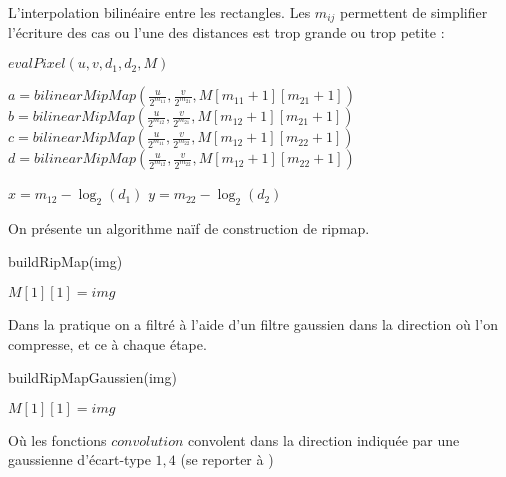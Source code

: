 \medbreak
\medbreak

L'interpolation bilinéaire entre les rectangles.
Les $m_{ij}$ permettent de simplifier l'écriture des cas ou l'une des distances est trop grande ou trop petite :

\medbreak
\medbreak

\begin{algorithm}[H]
\caption{$evalPixel(u,v,d_1,d_2,M)$}

$a=bilinearMipMap(\frac{u}{2^{m_{11}}},\frac{v}{2^{m_{21}}},M[m_{11}+1][m_{21}+1])$\;
$b=bilinearMipMap(\frac{u}{2^{m_{12}}},\frac{v}{2^{m_{21}}},M[m_{12}+1][m_{21}+1])$\;$c=bilinearMipMap(\frac{u}{2^{m_{11}}},\frac{v}{2^{m_{22}}},M[m_{12}+1][m_{22}+1])$\;
$d=bilinearMipMap(\frac{u}{2^{m_{12}}},\frac{v}{2^{m_{22}}},M[m_{12}+1][m_{22}+1])$\;

$x = m_{12} - \log_2(d_1)$\;
$y = m_{22} - \log_2(d_2)$\;

\end{algorithm}



On présente un algorithme naïf de construction de ripmap.
\medbreak
\medbreak
\begin{algorithm}[H]
\caption{buildRipMap(img)}
$M[1][1] = img$\;

\end{algorithm}
\medbreak
\medbreak
Dans la pratique on a filtré à l'aide d'un filtre gaussien dans la direction où l'on compresse, et ce à chaque étape.
\medbreak
\medbreak
\begin{algorithm}[H]
\caption{buildRipMapGaussien(img)}
$M[1][1] = img$\;

\end{algorithm}
\medbreak
\medbreak
Où les fonctions $convolution$ convolent dans la direction indiquée par une gaussienne d'écart-type $1,4$ (se reporter à \cite{morel2011sift})


